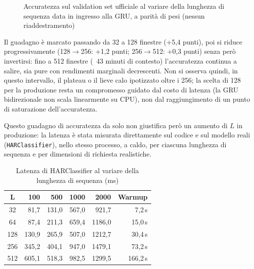 \documentclass[conference]{IEEEtran}
\begin{document}
\begin{figure}[htbp]
\centering
{}
\caption{Accuratezza sul validation set ufficiale al variare della
lunghezza di sequenza data in ingresso alla GRU, a parità di pesi
(nessun riaddestramento)}
\label{fig:har-seqlen-sweep}
\end{figure}

Il guadagno è marcato passando da 32 a 128 finestre (+5,4 punti), poi
si riduce progressivamente (128$\to$256: +1,2 punti; 256$\to$512: +0,3
punti) senza però invertirsi: fino a 512 finestre (~43 minuti di
contesto) l'accuratezza continua a salire, sia pure con rendimenti
marginali decrescenti. Non si osserva quindi, in questo intervallo, il
plateau o il lieve calo ipotizzato oltre i 256; la scelta di 128 per la
produzione resta un compromesso guidato dal costo di latenza (la GRU
bidirezionale non scala linearmente su CPU), non dal raggiungimento di
un punto di saturazione dell'accuratezza.

Questo guadagno di accuratezza da solo non giustifica però un
aumento di $L$ in produzione: la latenza è stata misurata direttamente
sul codice e sul modello reali (\texttt{HARClassifier}), nello stesso
processo, a caldo, per ciascuna lunghezza di sequenza e per dimensioni
di richiesta realistiche.

\begin{table}[htbp]
\caption{Latenza di HARClassifier al variare della lunghezza di sequenza (ms)}
\centering
\scriptsize
\begin{tabular}{|c|r|r|r|r|r|}
\hline
\textbf{L} & \textbf{100} & \textbf{500} & \textbf{1000} & \textbf{2000} & \textbf{Warmup} \\
\hline
32  & 81,7  & 131,0 & 567,0 & 921,7  & 7,2\,s \\
\hline
64  & 87,4  & 211,3 & 659,4 & 1186,0 & 15,0\,s \\
\hline
128 & 130,9 & 265,9 & 507,0 & 1212,7 & 30,4\,s \\
\hline
256 & 345,2 & 404,1 & 947,0 & 1479,1 & 73,2\,s \\
\hline
512 & 605,1 & 518,3 & 982,5 & 1299,5 & 166,2\,s \\
\hline
\end{tabular}
\label{tab:har-seqlen-latency}
\end{table}
\end{document}
